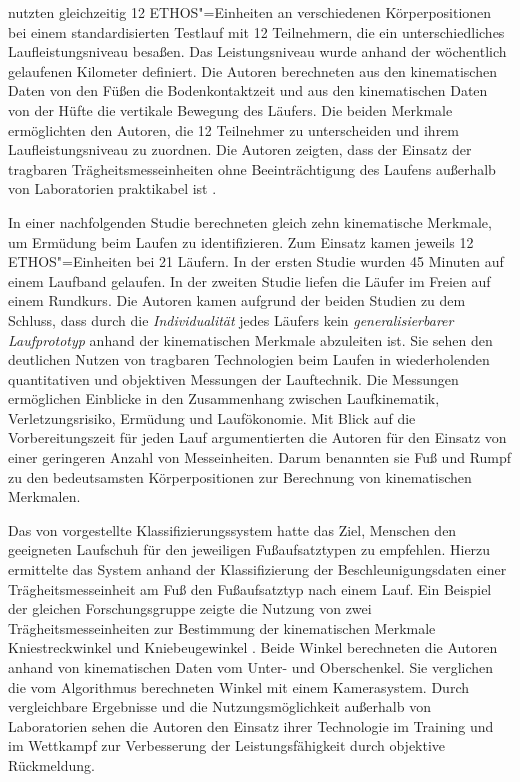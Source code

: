 \citet{Strohrmann2011} nutzten gleichzeitig 12 ETHOS"=Einheiten an verschiedenen Körperpositionen bei einem standardisierten Testlauf mit 12 Teilnehmern, die ein unterschiedliches Laufleistungsniveau besaßen. Das Leistungsniveau wurde anhand der wöchentlich gelaufenen Kilometer definiert. Die Autoren berechneten aus den kinematischen Daten von den Füßen die Bodenkontaktzeit und aus den kinematischen Daten von der Hüfte die vertikale Bewegung des Läufers. Die beiden Merkmale ermöglichten den Autoren, die 12 Teilnehmer zu unterscheiden und ihrem Laufleistungsniveau zu zuordnen. Die Autoren zeigten, dass der Einsatz der tragbaren Trägheitsmesseinheiten ohne Beeinträchtigung des Laufens außerhalb von Laboratorien praktikabel ist \citep{Strohrmann2011a}.

In einer nachfolgenden Studie berechneten \citet{Strohrmann2012} gleich zehn kinematische Merkmale, um Ermüdung beim Laufen zu identifizieren. Zum Einsatz kamen jeweils 12 ETHOS"=Einheiten bei 21 Läufern. In der ersten Studie wurden 45 Minuten auf einem Laufband gelaufen. In der zweiten Studie liefen die Läufer im Freien auf einem Rundkurs. Die Autoren kamen aufgrund der beiden Studien zu dem Schluss, dass durch die \emph{Individualität} jedes Läufers kein \emph{generalisierbarer Laufprototyp} anhand der kinematischen Merkmale abzuleiten ist. Sie sehen den deutlichen Nutzen von tragbaren Technologien beim Laufen in wiederholenden quantitativen und objektiven Messungen der Lauftechnik. Die Messungen ermöglichen Einblicke in den Zusammenhang zwischen Laufkinematik, Verletzungsrisiko, Ermüdung und Laufökonomie. Mit Blick auf die Vorbereitungszeit für jeden Lauf argumentierten die Autoren für den Einsatz von einer geringeren Anzahl von Messeinheiten. Darum benannten sie Fuß und Rumpf zu den bedeutsamsten Körperpositionen zur Berechnung von kinematischen Merkmalen.

Das von \citet{Eskofier2013} vorgestellte Klassifizierungssystem hatte das Ziel, Menschen den geeigneten Laufschuh für den jeweiligen Fußaufsatztypen zu empfehlen. Hierzu ermittelte das System anhand der Klassifizierung der Beschleunigungsdaten einer Trägheitsmesseinheit am Fuß den Fußaufsatztyp nach einem Lauf. Ein Beispiel der gleichen Forschungsgruppe zeigte die Nutzung von zwei Trägheitsmesseinheiten zur Bestimmung der kinematischen Merkmale Kniestreckwinkel und Kniebeugewinkel \citep{Jakob2013}. Beide Winkel berechneten die Autoren anhand von kinematischen Daten vom Unter- und Oberschenkel. Sie verglichen die vom Algorithmus berechneten Winkel mit einem Kamerasystem. Durch vergleichbare Ergebnisse und die Nutzungsmöglichkeit außerhalb von Laboratorien sehen die Autoren den Einsatz ihrer Technologie im Training und im Wettkampf zur Verbesserung der Leistungsfähigkeit durch objektive Rückmeldung.

